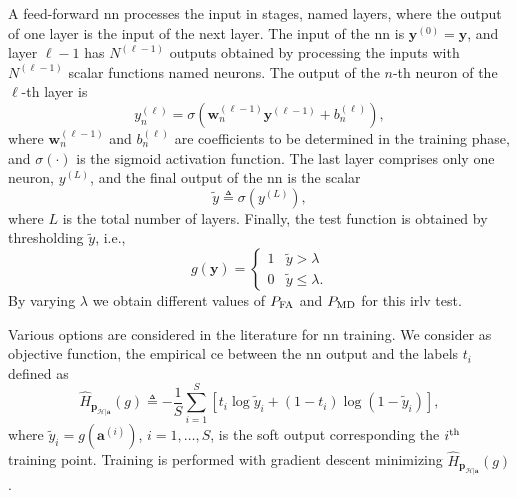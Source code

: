 \documentclass[conference,final]{IEEEtran}
\newcommand{\hatcross}[2]{\hat{H}_{#1}(#2)}
\begin{document}
A feed-forward \ac{nn} processes the input in stages, named layers, where the output of one layer is the input of the next layer. The input of the \ac{nn} is $\bm{y}^{(0)} = \bm{y}$, and layer $\ell-1$ has $N^{(\ell-1)}$ outputs obtained by processing the inputs with $N^{(\ell-1)}$ scalar functions named neurons. The output of the $n$-th neuron of the $\ell$-th layer is
\begin{equation}\label{eq:nonLin}
y_n^{(\ell)} = \sigma\left( \bm{w}_n^{(\ell -1)}\bm{y}^{(\ell-1)}+b_n^{(\ell)} \right),
\end{equation}
where $\bm{w}_n^{(\ell -1)}$ and $b_n^{(\ell)}$ are coefficients to be determined in the training phase, and $\sigma(\cdot)$ is the sigmoid activation function. 
The last layer comprises only one neuron, $y^{(L)}$, and the final output of the \ac{nn} is the scalar 
\begin{equation}
	\tilde{y} \triangleq \sigma(y^{(L)}),	
\end{equation}
where $L$ is the total number of layers. Finally, the test function is obtained by thresholding $\tilde{y}$, i.e.,
\begin{equation}
\label{eq:decNN}
    g(\bm{y}) = \begin{cases}
    1 & \tilde{y} > \lambda \\
    0 & \tilde{y} \leq \lambda.
    \end{cases}
\end{equation}
By varying $\lambda$ we obtain different values of $P_{\rm FA}$ and $P_{\rm MD}$ for this \ac{irlv} test.

Various options are considered in the literature for \ac{nn} training. We consider as objective function, the empirical \ac{ce} between the \ac{nn} output and the labels $t_i$ defined as
\begin{equation}\label{eq:ce}
\hatcross{\bm p_{\mathcal{H}|\bm a}}{g} \triangleq -\frac{1}{S} \sum_{i=1}^{S}\left[t_i\log \tilde{y}_i +\left(1-t_i\right)\log\left(1-\tilde{y}_i\right)\right],
\end{equation}
where $\tilde{y}_i = g(\bm a^{(i)})$, $i=1, \ldots, S$, is the soft output corresponding the $i^{\rm th}$  training point. Training is performed with gradient descent minimizing $\hatcross{\bm p_{\mathcal{H}|\bm a}}{g}$.
\end{document}

